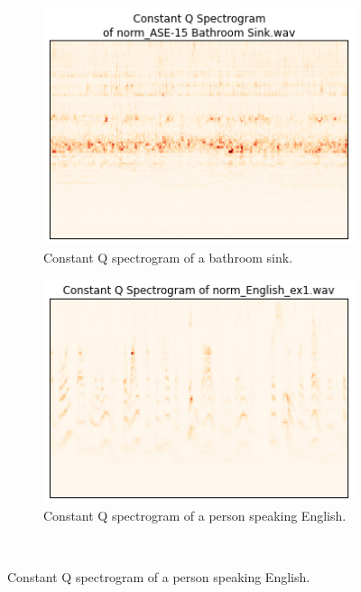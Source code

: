 \documentclass{sig-alternate-05-2015}
\begin{document}
    \begin{figure}[hbt]
    \centering
    \begin{subfigure}[b]{0.45\textwidth}
      \centering
      \includegraphics[width=\textwidth]{figures/cqt_bathroom_sink.png}
      \caption{Constant Q spectrogram of a bathroom sink.}
      \label{fig:cqt-applause}
    \end{subfigure}
    \hfill 
    \begin{subfigure}[b]{0.45\textwidth}
      \centering
      \includegraphics[width=\textwidth]{figures/cqt_english.png}
      \caption{Constant Q spectrogram of a person speaking English.}
      \label{fig:cqt-applause}
    \end{subfigure}
    \\

\end{figure}
\end{document}
